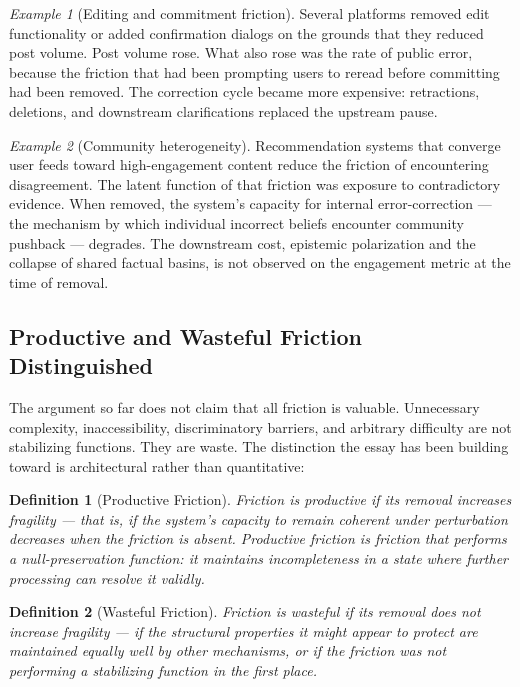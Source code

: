 \documentclass[11pt]{article}
\newtheorem{definition}{Definition}
\theoremstyle{remark}
\newtheorem*{example*}{Example}
\begin{document}
\begin{example*}[Editing and commitment friction]
Several platforms removed edit functionality or added confirmation dialogs on the grounds that they reduced post volume. Post volume rose. What also rose was the rate of public error, because the friction that had been prompting users to reread before committing had been removed. The correction cycle became more expensive: retractions, deletions, and downstream clarifications replaced the upstream pause.
\end{example*}

\begin{example*}[Community heterogeneity]
Recommendation systems that converge user feeds toward high-engagement content reduce the friction of encountering disagreement. The latent function of that friction was exposure to contradictory evidence. When removed, the system's capacity for internal error-correction --- the mechanism by which individual incorrect beliefs encounter community pushback --- degrades. The downstream cost, epistemic polarization and the collapse of shared factual basins, is not observed on the engagement metric at the time of removal.
\end{example*}

\subsection{Productive and Wasteful Friction Distinguished}

The argument so far does not claim that all friction is valuable. Unnecessary complexity, inaccessibility, discriminatory barriers, and arbitrary difficulty are not stabilizing functions. They are waste. The distinction the essay has been building toward is architectural rather than quantitative:

\begin{definition}[Productive Friction]
\label{def:productive_friction}
Friction is productive if its removal increases fragility --- that is, if the system's capacity to remain coherent under perturbation decreases when the friction is absent. Productive friction is friction that performs a null-preservation function: it maintains incompleteness in a state where further processing can resolve it validly.
\end{definition}

\begin{definition}[Wasteful Friction]
\label{def:wasteful_friction}
Friction is wasteful if its removal does not increase fragility --- if the structural properties it might appear to protect are maintained equally well by other mechanisms, or if the friction was not performing a stabilizing function in the first place.
\end{definition}
\end{document}
